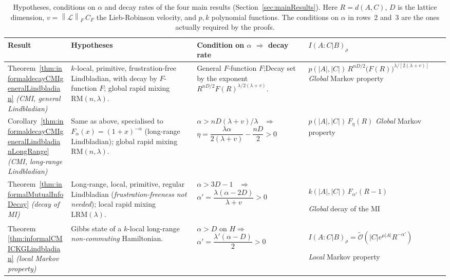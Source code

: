 \documentclass[11pt]{article}
\numberwithin{equation}{section}
\numberwithin{figure}{section}
\numberwithin{table}{section}
\theoremstyle{definition}
\theoremstyle{plain}
\theoremstyle{remark}
\newcommand{\Li}{\mathcal{L}}
\newcommand{\normm}[2]{\left\lVert#1\right\rVert_{#2}}
\newcommand{\abs}[1]{\left \vert#1\right\vert}
\begin{document}
\begin{table}[t]
\centering
\setlength{\tabcolsep}{5pt}
\renewcommand{\arraystretch}{1.5}
\footnotesize
\begin{tabular}{|p{1.9cm}|p{4.2cm}|p{3.6cm}|p{4.6cm}|}
\hline
\textbf{Result} & \textbf{Hypotheses} & \textbf{Condition on $\alpha$ $\Rightarrow$ decay rate} & \textbf{$I(A:C|B)_\rho$} \\
\hline
\hline
Theorem~\ref{thm:informaldecayCMIgeneralLindbladian} \newline
\emph{(CMI, general Lindbladian)}
&
$k$-local, primitive, frustration-free Lindbladian, with decay by $F$-function $F$; global rapid mixing $\mathrm{RM}(n,\lambda)$.
&
General $F$-function $F$;\newline Decay set by the exponent $R^{nD/2}F(R)^{\lambda/2(\lambda+v)}$.
&
$p(\abs{A},\abs{C})\, R^{nD/2} \big(F(R)\big)^{\lambda/[2(\lambda+v)]}$
\newline
\emph{Global} Markov property
\\
\hline
Corollary~\ref{thm:informaldecayCMIgeneralLindbladianLongRange} \newline
\emph{(CMI, long-range Lindbladian)}
&
Same as above, specialised to $F_\alpha(x) = (1+x)^{-\alpha}$ (long-range Lindbladian); global rapid mixing $\mathrm{RM}(n,\lambda)$.
&
$\alpha > nD(\lambda+v)/\lambda$ \  $\Rightarrow$ \newline $ \eta=\dfrac{\lambda \alpha}{2(\lambda+v)} - \dfrac{nD}{2} > 0$
&
$ p(\abs{A},\abs{C})\, F_\eta(R)$
\newline 
\emph{Global} Markov property
\\
\hline
Theorem~\ref{thm:informalMutualInfoDecay} \newline
\emph{(decay of MI)}
&
Long-range, local, primitive, regular Lindbladian (\emph{frustration-freeness not needed}); local rapid mixing $\mathrm{LRM}(\lambda)$.
&
$\alpha > 3D - 1$ \ $\Rightarrow$ \newline $\alpha' = \dfrac{\lambda(\alpha - 2D)}{\lambda + v} > 0$
&
$ k(\abs{A},\abs{C})\, F_{\alpha'}(R-1)$

\emph{Global} decay of the MI
\\
\hline
Theorem \ref{thm:informalCMICKGLindbladian} \newline
\emph{(local Markov property)}
&
Gibbs state of a $k$-local long-range \emph{non-commuting} Hamiltonian.
&
$\alpha > D$ on $H$\newline $\Rightarrow$ \ $\alpha' = \dfrac{\lambda'(\alpha - D)}{2} > 0$
&
$I(A:C|B)_\rho = \tilde{\mathcal{O}}(\abs{C}e^{\mu \abs{A}}R^{-\alpha'})$

\emph{Local} Markov property
\\
\hline
\end{tabular}
\caption{Hypotheses, conditions on $\alpha$ and decay rates of the four main
results (Section~\ref{sec:mainResults}). Here $R = d(A,C)$,
$D$ is the lattice dimension, $v = \normm{\Li}{F}\, C_F$ the Lieb-Robinson
velocity, and $p,k$ polynomial functions. The conditions on $\alpha$ in
rows~2 and~3 are the ones actually required by the proofs.}
\label{tab:hypothesesMainResults}
\end{table}
\end{document}
